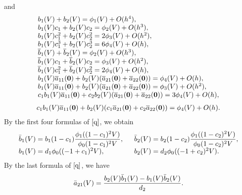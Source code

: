 \documentclass{article}
\begin{document}
and
\begin{equation}
\begin{array}
[c]{ll} b_{1}(V)+b_{2}(V)=\phi_{1}(V)+O(h^{4}),
\\b_{1}(V)c_{1}+b_{2}(V)c_{2}=\phi_{2}(V)+O(h^{3}),
\\b_{1}(V)c_{1}^{2}+b_{2}(V)c_{2}^{2}=2\phi_{3}(V)+O(h^2),
\\ b_{1}(V)c_{1}^{3}+b_{2}(V)c_{2}^{3}=6\phi_{4}(V)+O(h),
\\\overline{b}_{1}(V)+\overline{b}_{2}(V)=\phi_{2}(V)+O(h^{3}),
\\
\overline{b}_{1}(V)c_{1}+\overline{b}_{2}(V)c_{2}=\phi_{3}(V)+O(h^2),
\\
\overline{b}_{1}(V)c_{1}^2+\overline{b}_{2}(V)c_{2}^2=2\phi_{4}(V)+O(h),\\
b_{1}(V)\overline{a}_{11}(\textbf{0})+b_{2}(V)(\overline{a}_{21}(\textbf{0})+\overline{a}_{22}(\textbf{0}))=\phi_{4}(V)+O(h),
\\
b_{1}(V)\overline{a}_{11}(\textbf{0})+b_{2}(V)(\overline{a}_{21}(\textbf{0})+\overline{a}_{22}(\textbf{0}))=\phi_{3}(V)+O(h^2),
\\
c_{1}b_{1}(V)\overline{a}_{11}(\textbf{0})+c_{2}b_{2}(V)(\overline{a}_{21}(\textbf{0})+\overline{a}_{22}(\textbf{0}))=3\phi_{4}(V)+O(h),
\\
\end{array}
\label{s}%
\end{equation}
\begin{equation*}
\begin{array}
[c]{ll}
c_{1}b_{1}(V)\overline{a}_{11}(\textbf{0})+b_{2}(V)(c_{1}\overline{a}_{21}(\textbf{0})+c_{2}\overline{a}_{22}(\textbf{0}))=\phi_{4}(V)+O(h).
\end{array}
\end{equation*}
By the first four formulas of $\eqref{q}$, we obtain
\begin{equation}
\begin{array}
[c]{ll}
\bar{b}_{1}(V)=b_{1}(1-c_{1})\dfrac{\phi_{1}((1-c_{1})^{2}V)}{\phi_{0}(1-c_{1})^{2}V},\
\
&\bar{b}_{2}(V)=b_{2}(1-c_{2})\dfrac{\phi_{1}((1-c_{2})^{2}V)}{\phi_{0}(1-c_{2})^{2}V},\\
b_{1}(V)=d_{1}\phi_{0}((-1+c_{1})^{2}V),\ \
&b_{2}(V)=d_{2}\phi_{0}((-1+c_{2})^{2}V).
\end{array}
\label{t}%
\end{equation}
By the last formula of  $\eqref{q}$, we have
\begin{equation*}
\begin{array}
[c]{ll}
\bar{a}_{21}(V)=\dfrac{b_{2}(V)\bar{b}_{1}(V)-b_{1}(V)\bar{b}_{2}(V)}{d_{2}}.
\end{array}
\label{u}%
\end{equation*}
\end{document}
